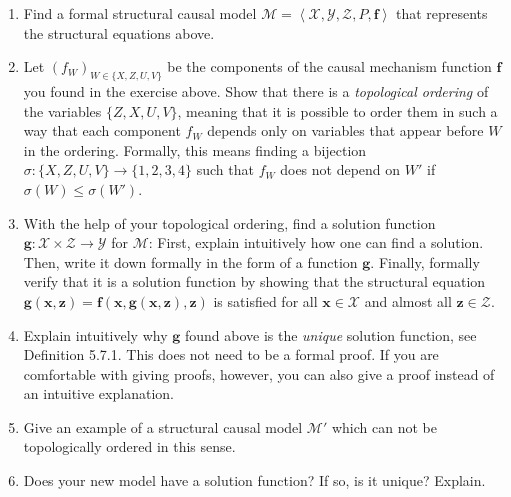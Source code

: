 \begin{enumerate}
  \item Find a formal structural causal model $\mathcal{M} = \left\langle \boldsymbol{\mathcal{X}}, \boldsymbol{\mathcal{Y}}, \boldsymbol{\mathcal{Z}}, P, \boldsymbol{f}\right\rangle$ that represents the structural equations above.
  \item Let $(f_W)_{W \in \{X,Z,U,V\}}$ be the components of the causal mechanism function $\boldsymbol{f}$ you found in the exercise above.
    Show that there is a \emph{topological ordering} of the variables $\{Z,X,U,V\}$, meaning that it is possible to order them in such a way that each component $f_W$ depends only on variables that appear before $W$ in the ordering.
    Formally, this means finding a bijection $\sigma: \{X, Z, U, V\} \to \{1, 2, 3, 4\}$ such that $f_{W}$ does not depend on $W'$ if $\sigma(W) \leq \sigma(W')$. 
  \item With the help of your topological ordering, find a solution function $\boldsymbol{g}: \boldsymbol{\mathcal{X}} \times \boldsymbol{\mathcal{Z}} \to \boldsymbol{\mathcal{Y}}$ for $\mathcal{M}$:
    First, explain intuitively how one can find a solution. Then, write it down formally in the form of a function $\boldsymbol{g}$.
    Finally, formally verify that it is a solution function by showing that the structural equation $\boldsymbol{g}(\boldsymbol{x}, \boldsymbol{z}) = \boldsymbol{f}(\boldsymbol{x}, \boldsymbol{g}(\boldsymbol{x}, \boldsymbol{z}), \boldsymbol{z})$ is satisfied for all $\boldsymbol{x} \in \boldsymbol{\mathcal{X}}$ and almost all $\boldsymbol{z} \in \boldsymbol{\mathcal{Z}}$.
  \item Explain intuitively why $\boldsymbol{g}$ found above is the \emph{unique} solution function, see Definition 5.7.1. This does not need to be a formal proof.
    If you are comfortable with giving proofs, however, you can also give a proof instead of an intuitive explanation.
  \item Give an example of a structural causal model $\mathcal{M}'$ which can not be topologically ordered in this sense. 
  \item Does your new model have a solution function? If so, is it unique? Explain.
  \end{enumerate}
